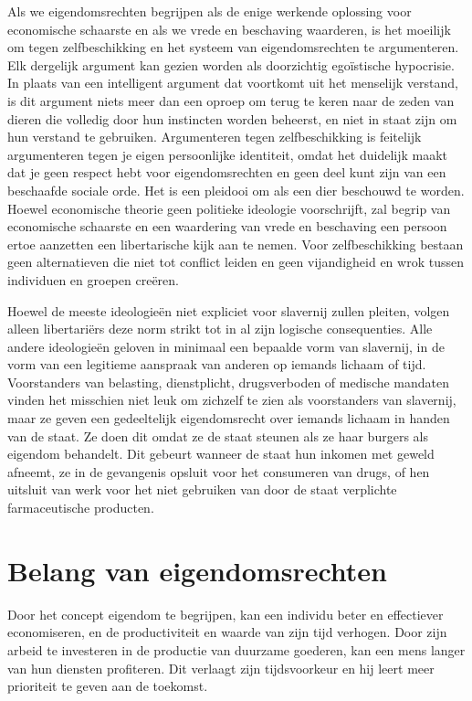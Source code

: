 Als we eigendomsrechten begrijpen als de enige werkende oplossing voor economische schaarste en als we vrede en beschaving waarderen, is het moeilijk om tegen zelfbeschikking en het systeem van eigendomsrechten te argumenteren. Elk dergelijk argument kan gezien worden als doorzichtig egoïstische hypocrisie. In plaats van een intelligent argument dat voortkomt uit het menselijk verstand, is dit argument niets meer dan een oproep om terug te keren naar de zeden van dieren die volledig door hun instincten worden beheerst, en niet in staat zijn om hun verstand te gebruiken. Argumenteren tegen zelfbeschikking is feitelijk argumenteren tegen je eigen persoonlijke identiteit, omdat het duidelijk maakt dat je geen respect hebt voor eigendomsrechten en geen deel kunt zijn van een beschaafde sociale orde. Het is een pleidooi om als een dier beschouwd te worden. Hoewel economische theorie geen politieke ideologie voorschrijft, zal begrip van economische schaarste en een waardering van vrede en beschaving een persoon ertoe aanzetten een libertarische kijk aan te nemen. Voor zelfbeschikking bestaan geen alternatieven die niet tot conflict leiden en geen vijandigheid en wrok tussen individuen en groepen creëren.

Hoewel de meeste ideologieën niet expliciet voor slavernij zullen pleiten, volgen alleen libertariërs deze norm strikt tot in al zijn logische consequenties. Alle andere ideologieën geloven in minimaal een bepaalde vorm van slavernij, in de vorm van een legitieme aanspraak van anderen op iemands lichaam of tijd. Voorstanders van belasting, dienstplicht, drugsverboden of medische mandaten vinden het misschien niet leuk om zichzelf te zien als voorstanders van slavernij, maar ze geven een gedeeltelijk eigendomsrecht over iemands lichaam in handen van de staat. Ze doen dit omdat ze de staat steunen als ze haar burgers als eigendom behandelt. Dit gebeurt wanneer de staat hun inkomen met geweld afneemt, ze in de gevangenis opsluit voor het consumeren van drugs, of hen uitsluit van werk voor het niet gebruiken van door de staat verplichte farmaceutische producten.\autocite{54}

\section{Belang van eigendomsrechten}

Door het concept eigendom te begrijpen, kan een individu beter en effectiever economiseren, en de productiviteit en waarde van zijn tijd verhogen. Door zijn arbeid te investeren in de productie van duurzame goederen, kan een mens langer van hun diensten profiteren. Dit verlaagt zijn tijdsvoorkeur en hij leert meer prioriteit te geven aan de toekomst.

